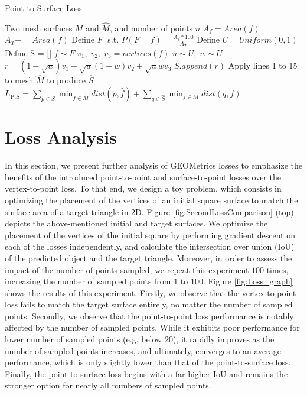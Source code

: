 \documentclass{article}
\begin{document}
\begin{algorithm}[tbh]
   \caption{Point-to-Surface Loss}
   \label{alg:pts}
\begin{algorithmic}[1]
     Two mesh surfaces $M$ and $\hat{M}$, and number of points $n$
    \STATE $A_f = Area(f)$
    \STATE $A_T \mathrel{{+}{=}} Area(f)$
    \ENDFOR
    \STATE Define $F \;$ s.t. $P(F = f) =  \frac{A_f*100}{A_T}$
    \STATE Define $U = Uniform(0,1)$
    \STATE Define S = [] 
    \STATE $f \sim F$
    \STATE $v_1, \; v_2, \; v_3  = vertices(f)$
    \STATE $u \sim U, \; w \sim U $
    \STATE $r = (1-\sqrt u)v_1 + \sqrt u(1-w)v_2 + \sqrt{u}wv_3$
    \STATE $S.append(r)$
    \ENDFOR
    \STATE Apply lines 1 to 15 to mesh $\hat{M}$ to produce $\hat{S}$
    \STATE $\displaystyle L_{\text{PtS}} = \sum_{p \in S} \min_{\hat{f} \in \hat{M}} dist(p, \hat{f}) + \sum_{q \in \hat{S}} \min_{f \in M} dist(q, f)$
\end{algorithmic}
\end{algorithm}

\section{Loss Analysis}
In this section, we present further analysis of GEOMetrics losses to emphasize the benefits of the introduced point-to-point and surface-to-point losses over the vertex-to-point loss. To that end, we design a toy problem, which consists in optimizing the placement of the vertices of an initial square surface to match the surface area of a target triangle in 2D. Figure \ref{fig:SecondLossComparison} (top) depicts the above-mentioned initial and target surfaces. We optimize the placement of the vertices of the initial square by performing gradient descent on each of the losses independently, and calculate the intersection over union (IoU) of the predicted object and the target triangle. Moreover, in order to assess the impact of the number of points sampled, we repeat this experiment $100$ times, increasing the number of sampled points from $1$ to $100$. Figure \ref{fig:Loss_graph} shows the results of this experiment. Firstly, we observe that the vertex-to-point loss fails to match the target surface entirely, no matter the number of sampled points. Secondly, we observe that the point-to-point loss performance is notably affected by the number of sampled points. While it exhibits poor performance for lower number of sampled points (e.g. below $20$), it rapidly improves as the number of sampled points increases, and ultimately, converges to an average performance, which is only slightly lower than that of the point-to-surface loss. Finally, the point-to-surface loss begins with a far higher IoU and remains the stronger option for nearly all numbers of sampled points.
\end{document}
